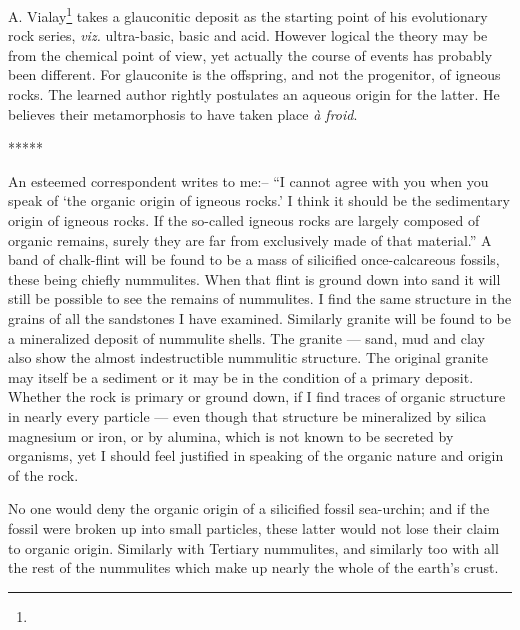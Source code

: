 \documentclass[a4paper, 12pt, oneside]{article}
\begin{document}
A. Vialay\footnote{} takes a glauconitic deposit as the starting point of his evolutionary rock series, \emph{viz.} ultra-basic, basic and acid. However logical the theory may be from the chemical point of view, yet actually the course of events has probably been different. For glauconite is the offspring, and not the progenitor, of igneous rocks. The learned author rightly postulates an aqueous origin for the latter. He believes their metamorphosis to have taken place \emph{à froid}.

\centerline{*\hspace{15mm}*\hspace{15mm}*\hspace{15mm}*\hspace{15mm}*}
\bigskip

An esteemed correspondent writes to me:-- ``I cannot agree with you when you speak of `the organic origin of igneous rocks.' I think it should be the sedimentary origin of igneous rocks. If the so-called igneous rocks are largely composed of organic remains, surely they are far from exclusively made of that material.'' A band of chalk-flint will be found to be a mass of silicified once-calcareous fossils, these being chiefly nummulites. When that flint is ground down into sand it will still be possible to see the remains of nummulites. I find the same structure in the grains of all the sandstones I have examined. Similarly granite will be found to be a mineralized deposit of nummulite shells. The granite --- sand, mud and clay also show the almost indestructible nummulitic structure. The original granite may itself be a sediment or it may be in the condition of a primary deposit. Whether the rock is primary or ground down, if I find traces of organic structure in nearly every particle --- even though that structure be mineralized by silica magnesium or iron, or by alumina, which is not known to be secreted by organisms, yet I should feel justified in speaking of the organic nature and origin of the rock.

No one would deny the organic origin of a silicified fossil sea-urchin; and if the fossil were broken up into small particles, these latter would not lose their claim to organic origin. Similarly with Tertiary nummulites, and similarly too with all the rest of the nummulites which make up nearly the whole of the earth's crust.
\end{document}
